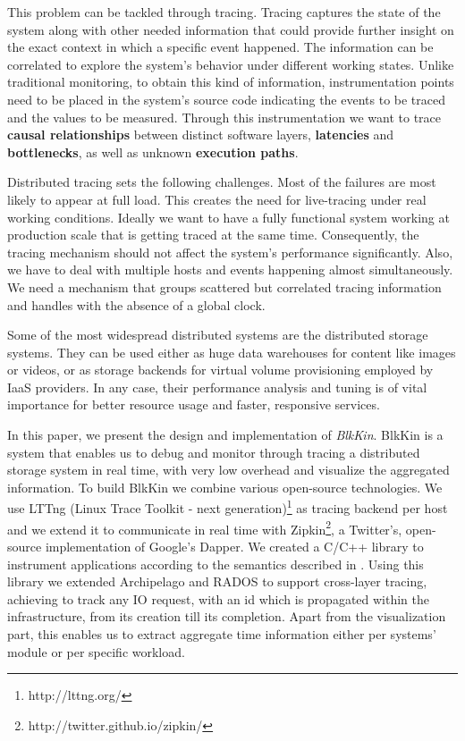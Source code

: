 \documentclass[11pt,journal,compsoc]{IEEEtran}
\begin{document}
This problem can be tackled through tracing. Tracing captures the state of the
system along with other needed information that could provide further insight
on the exact context in which a specific event happened. The information can be
correlated to explore the system's behavior under different working states.
Unlike traditional monitoring, to obtain this kind of information,
instrumentation points need to be placed in the system's source code indicating
the events to be traced and the values to be measured. Through this
instrumentation we want to trace \textbf{causal relationships} between distinct
software layers, \textbf{latencies} and \textbf{bottlenecks}, as well as
unknown \textbf{execution paths}.

Distributed tracing sets the following challenges. Most of the failures are most
likely to appear at full load. This creates the need for live-tracing under real
working conditions. Ideally we want to have a fully functional system working at
production scale that is getting traced at the same time. Consequently, the
tracing mechanism should not affect the system's performance significantly.
Also, we have to deal with multiple hosts and events happening almost
simultaneously. We need a mechanism that groups scattered but correlated tracing
information and handles with the absence of a global clock.

Some of the most widespread distributed systems are the distributed storage
systems. They can be used either as huge data warehouses for content like images
or videos, or as storage backends for virtual volume provisioning employed by
IaaS providers. In any case, their performance analysis and tuning is of vital
importance for better resource usage and faster, responsive services.

In this paper, we present the design and implementation of \emph{BlkKin}.
BlkKin is a system that enables us to debug and monitor through tracing a
distributed storage system in real time, with very low overhead and visualize
the aggregated information. To build BlkKin we combine various open-source
technologies. We use LTTng (Linux Trace Toolkit - next
generation)\footnote{http://lttng.org/} as tracing backend per host and we
extend it to communicate in real time with
Zipkin\footnote{http://twitter.github.io/zipkin/}, a Twitter's, open-source
implementation of Google's Dapper\cite{dapper}. We created a C/C++ library to
instrument applications according to the semantics described in \cite{dapper}.
Using this library we extended Archipelago\cite{archip} and RADOS\cite{rados} to
support cross-layer tracing, achieving to track any IO request, with an id which
is propagated within the infrastructure, from its creation
till its completion. Apart from the visualization part, this enables us to
extract aggregate time information either per systems' module or per specific
workload.
\end{document}
